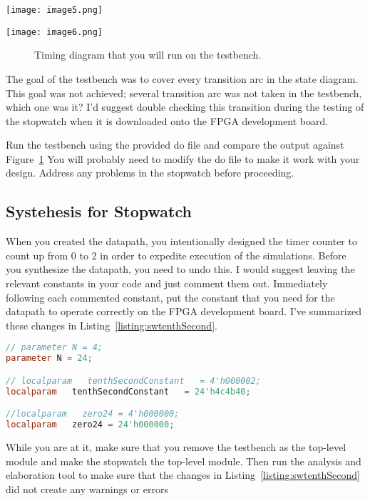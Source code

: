 \begin{landscape}

\texttt{[image: image5.png]}

\texttt{[image: image6.png]}
\begin{figure}
\caption{Timing diagram that you will run on the testbench.}
\label{fig:swTiming}
\end{figure}
\end{landscape}

The goal of the testbench was to cover every transition arc in the state
diagram. This goal was not achieved; several transition arc was not
taken in the testbench, which one was it? I'd suggest double checking
this transition during the testing of the stopwatch when it is
downloaded onto the FPGA development board.

Run the testbench using the provided do file and compare the output
against Figure~\ref{fig:swTiming} You will probably need to modify the do
file to make it work with your design. Address any problems in the
stopwatch before proceeding.

\subsection{Systehesis for Stopwatch}

When you created the datapath, you intentionally designed the timer
counter to count up from 0 to 2 in order to expedite execution of the
simulations. Before you synthesize the datapath, you need to undo this.
I would suggest leaving the relevant constants in your code and just
comment them out. Immediately following each commented constant, put the
constant that you need for the datapath to operate correctly on the
FPGA development board. I've summarized these changes in Listing~\ref{listing:swtenthSecond}.

\begin{lstlisting}[language=Verilog,
 caption={Changes to the datapath that will allow it to run properly on the FPGA development board.},
 label={listing:swtenthSecond},
 frame=single]
// parameter N = 4;	
parameter N = 24;	

// localparam   tenthSecondConstant   = 4'h000002;
localparam   tenthSecondConstant   = 24'h4c4b40;

//localparam   zero24 = 4'h000000;
localparam   zero24 = 24'h000000;
\end{lstlisting}


While you are at it, make sure that you remove the testbench as the
top-level module and make the stopwatch the top-level module. Then run
the analysis and elaboration tool to make sure that the changes in
Listing~\ref{listing:swtenthSecond} did not create any warnings or errors

